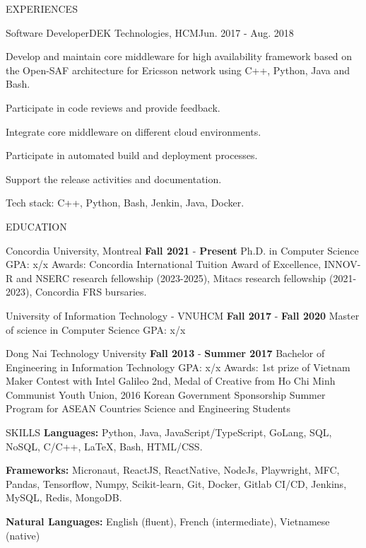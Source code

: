 \documentclass{resume} %
\begin{document}
\begin{rSection}{EXPERIENCES}
\begin{rWork}{Software Developer}{DEK Technologies, HCM}{Jun. 2017 - Aug. 2018}
    \item Develop and maintain core middleware for high availability framework based on the Open-SAF architecture for Ericsson network using C++, Python, Java and Bash.
    \item Participate in code reviews and provide feedback.
    \item Integrate core middleware on different cloud environments.
    \item Participate in automated build and deployment processes.
    \item Support the release activities and documentation.
    \item Tech stack: C++, Python, Bash, Jenkin, Java, Docker.
  \end{rWork}
\end{rSection}
\begin{rSection}{EDUCATION}
\begin{rSchool}{Concordia University, Montreal}
  {\textbf{Fall 2021} - \textbf{Present}}
  {Ph.D. in Computer Science}
  {GPA: x/x}
  {Awards: Concordia International Tuition Award of Excellence, INNOV-R and NSERC research fellowship (2023-2025), Mitacs research fellowship (2021-2023), Concordia FRS bursaries.}
\end{rSchool}
%
\begin{rSchool}{University of Information
Technology - VNUHCM}
  {\textbf{Fall 2017} - \textbf{Fall 2020}}
  {Master of science in Computer Science}
  {GPA: x/x}
  {} \vspace{-3ex}
\end{rSchool}
%
\begin{rSchool}{Dong Nai Technology University}
  {\textbf{Fall 2013} - \textbf{Summer 2017}}
  {Bachelor of Engineering in Information Technology}
  {GPA: x/x}
  {Awards: 1st prize of Vietnam Maker Contest with Intel Galileo 2nd, Medal of Creative from Ho Chi Minh Communist Youth Union, 2016 Korean Government Sponsorship Summer Program for ASEAN Countries Science and Engineering Students}
\end{rSchool}
\end{rSection}

\begin{rSection}{SKILLS}
\textbf{Languages:} Python, Java, JavaScript/TypeScript, GoLang, SQL, NoSQL, C/C++, \LaTeX, Bash, HTML/CSS.

\textbf{Frameworks:} Micronaut, ReactJS, ReactNative, NodeJs, Playwright, MFC, Pandas, Tensorflow, Numpy, Scikit-learn, Git, Docker, Gitlab CI/CD, Jenkins, MySQL, Redis, MongoDB.

\textbf{Natural Languages:} English (fluent), French (intermediate), Vietnamese (native)

\end{rSection}
\end{document}
